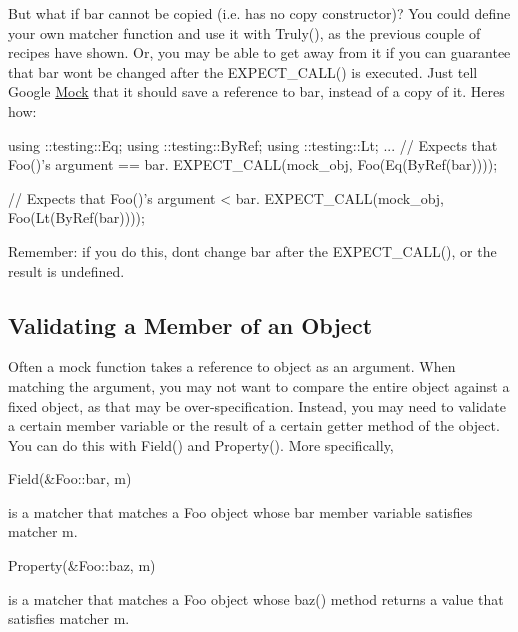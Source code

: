 But what if {\ttfamily bar} cannot be copied (i.\+e. has no copy constructor)? You could define your own matcher function and use it with {\ttfamily Truly()}, as the previous couple of recipes have shown. Or, you may be able to get away from it if you can guarantee that {\ttfamily bar} won\textquotesingle{}t be changed after the {\ttfamily E\+X\+P\+E\+C\+T\+\_\+\+C\+A\+L\+L()} is executed. Just tell Google \hyperlink{classMock}{Mock} that it should save a reference to {\ttfamily bar}, instead of a copy of it. Here\textquotesingle{}s how\+:


\begin{DoxyCode}
using ::testing::Eq;
using ::testing::ByRef;
using ::testing::Lt;
...
  \textcolor{comment}{// Expects that Foo()'s argument == bar.}
  EXPECT\_CALL(mock\_obj, Foo(Eq(ByRef(bar))));

  \textcolor{comment}{// Expects that Foo()'s argument < bar.}
  EXPECT\_CALL(mock\_obj, Foo(Lt(ByRef(bar))));
\end{DoxyCode}


Remember\+: if you do this, don\textquotesingle{}t change {\ttfamily bar} after the {\ttfamily E\+X\+P\+E\+C\+T\+\_\+\+C\+A\+L\+L()}, or the result is undefined.

\subsection*{Validating a Member of an Object}

Often a mock function takes a reference to object as an argument. When matching the argument, you may not want to compare the entire object against a fixed object, as that may be over-\/specification. Instead, you may need to validate a certain member variable or the result of a certain getter method of the object. You can do this with {\ttfamily Field()} and {\ttfamily Property()}. More specifically,


\begin{DoxyCode}
Field(&Foo::bar, m)
\end{DoxyCode}


is a matcher that matches a {\ttfamily Foo} object whose {\ttfamily bar} member variable satisfies matcher {\ttfamily m}.


\begin{DoxyCode}
Property(&Foo::baz, m)
\end{DoxyCode}


is a matcher that matches a {\ttfamily Foo} object whose {\ttfamily baz()} method returns a value that satisfies matcher {\ttfamily m}.

